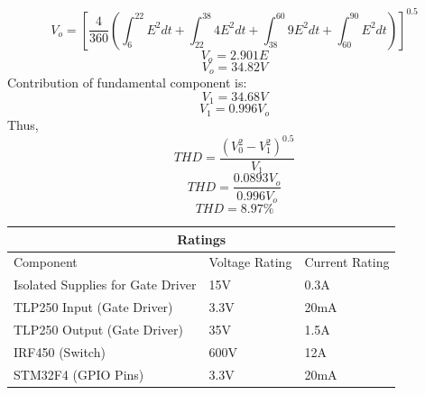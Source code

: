 $$V_o=[\frac{4}{360}(\int_{6}^{22}E^2dt+\int_{22}^{38}4E^2dt+\int_{38}^{60}9E^2dt+\int_{60}^{90}E^2dt)]^{0.5}$$
$$V_o = 2.901E$$
$$V_o = 34.82V$$
Contribution of fundamental component is:
$$V_1 = 34.68V$$
$$V_1 = 0.996V_o$$
Thus,
$$THD=\frac{(V_{0}^{2}-V_{1}^{2})^{0.5}}{V_1}$$
$$THD=\frac{0.0893V_o}{0.996V_o}$$
$$THD=8.97\%$$

\begin{center}
	\begin{tabular}{ |p{4cm}||p{4cm}|p{4cm}|  }
		\hline
		\multicolumn{3}{|c|}{Ratings} \\
		\hline
		Component & Voltage Rating & Current Rating\\
		\hline
		Isolated Supplies for Gate Driver & 15V & 0.3A\\
		TLP250 Input (Gate Driver) & 3.3V & 20mA\\
		TLP250 Output (Gate Driver) & 35V & 1.5A\\
		IRF450 (Switch) & 600V & 12A\\
		STM32F4 (GPIO Pins) & 3.3V & 20mA\\
		\hline
	\end{tabular}
\end{center}
